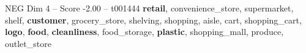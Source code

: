 \begin{textsample}{NEG Dim 4 – Score -2.00 – t001444}  \label{ex:f4_neg_010}
\textbf{retail}, convenience\_store, supermarket, shelf, \textbf{customer}, grocery\_store, shelving, shopping, aisle, cart, shopping\_cart, \textbf{logo}, \textbf{food}, \textbf{cleanliness}, food\_storage, \textbf{plastic}, shopping\_mall, produce, outlet\_store

\end{textsample}
